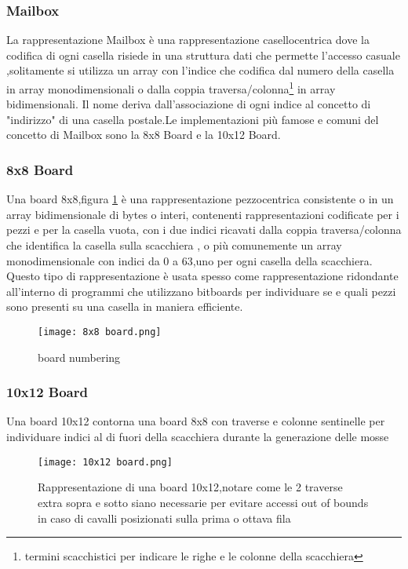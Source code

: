 \subsubsection{Mailbox}
La rappresentazione Mailbox è una rappresentazione casellocentrica dove la codifica di ogni casella risiede in una struttura dati
che permette l'accesso casuale ,solitamente si utilizza un array con l'indice che codifica dal numero della casella in array monodimensionali
o dalla coppia traversa/colonna\footnote{termini scacchistici per indicare le righe e le colonne della scacchiera} in array bidimensionali.
Il nome deriva dall'associazione di ogni indice al concetto di "indirizzo" di una casella postale.Le implementazioni più famose e
comuni del concetto di Mailbox sono la 8x8 Board e la 10x12 Board.

\subsubsection{8x8 Board}
Una board 8x8,figura \ref{otto} è una rappresentazione pezzocentrica consistente o in un array bidimensionale di bytes o interi, contenenti rappresentazioni codificate
per i pezzi e per la casella vuota, con i due indici ricavati dalla coppia traversa/colonna che identifica la casella sulla scacchiera ,
o più comunemente un array monodimensionale con indici da 0 a 63,uno per ogni casella della scacchiera.
Questo tipo di rappresentazione è usata spesso come rappresentazione ridondante all'interno di programmi che utilizzano bitboards
per individuare se e quali pezzi sono presenti su una casella in maniera efficiente.
\begin{figure}[!ht]
    \centering
    \texttt{[image: 8x8 board.png]}
    \caption{board numbering}
    \label{otto}
\end{figure}

\subsubsection{10x12 Board}
Una board 10x12  contorna una  board 8x8   con traverse e colonne sentinelle  per individuare  indici al di fuori della scacchiera durante la generazione delle mosse
\vfill
\begin{figure}[!ht]
    \centering
    \texttt{[image: 10x12 board.png]}
    \caption{Rappresentazione di una board 10x12,notare come le 2 traverse extra sopra e sotto siano necessarie per evitare accessi out of bounds in caso di cavalli posizionati sulla prima o ottava fila }
\end{figure}
\vfill
\clearpage


